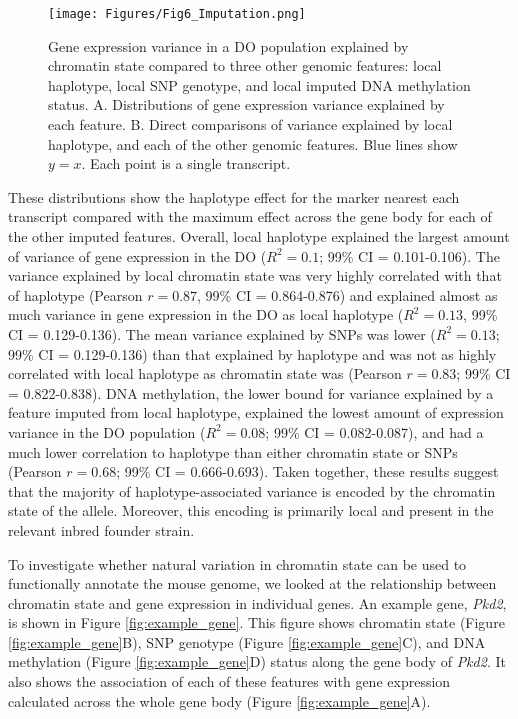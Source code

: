\documentclass[
  11pt,
]{article}
\begin{document}
\begin{figure}[ht!]
\texttt{[image: Figures/Fig6\_Imputation.png]} 
\caption{Gene expression variance in a DO population explained 
by chromatin state compared to three other genomic features: 
local haplotype, local SNP genotype, and local imputed DNA 
methylation status. A. Distributions of gene expression variance 
explained by each feature. B. Direct comparisons of 
variance explained by local haplotype, and each of the other 
genomic features. Blue lines show $y = x$. Each point is a 
single transcript.}
\label{fig:effect_distrubutions}
\end{figure}

These distributions show the haplotype effect for the marker nearest
each transcript compared with the maximum effect across the gene body
for each of the other imputed features. Overall, local haplotype
explained the largest amount of variance of gene expression in the DO
(\(R^2 = 0.1\); 99\% CI = 0.101-0.106). The variance explained by local
chromatin state was very highly correlated with that of haplotype
(Pearson \(r = 0.87\), 99\% CI = 0.864-0.876) and explained almost as
much variance in gene expression in the DO as local haplotype
(\(R^2 = 0.13\), 99\% CI = 0.129-0.136). The mean variance explained by
SNPs was lower (\(R^2 = 0.13\); 99\% CI = 0.129-0.136) than that
explained by haplotype and was not as highly correlated with local
haplotype as chromatin state was (Pearson \(r = 0.83\); 99\% CI =
0.822-0.838). DNA methylation, the lower bound for variance explained by
a feature imputed from local haplotype, explained the lowest amount of
expression variance in the DO population (\(R^2 = 0.08\); 99\% CI =
0.082-0.087), and had a much lower correlation to haplotype than either
chromatin state or SNPs (Pearson \(r = 0.68\); 99\% CI = 0.666-0.693).
Taken together, these results suggest that the majority of
haplotype-associated variance is encoded by the chromatin state of the
allele. Moreover, this encoding is primarily local and present in the
relevant inbred founder strain.

To investigate whether natural variation in chromatin state can be used
to functionally annotate the mouse genome, we looked at the relationship
between chromatin state and gene expression in individual genes. An
example gene, \textit{Pkd2}, is shown in Figure \ref{fig:example_gene}.
This figure shows chromatin state (Figure \ref{fig:example_gene}B), SNP
genotype (Figure \ref{fig:example_gene}C), and DNA methylation (Figure
\ref{fig:example_gene}D) status along the gene body of \textit{Pkd2}. It
also shows the association of each of these features with gene
expression calculated across the whole gene body (Figure
\ref{fig:example_gene}A).
\end{document}
